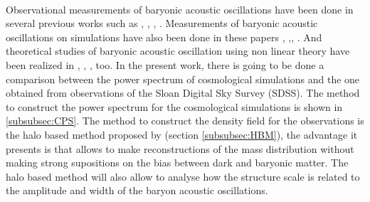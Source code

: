 \

Observational measurements of baryonic acoustic oscillations have been done in several previous works such 
as \cite{Obs01}, \cite{Obs02}, \cite{Obs03}, \cite{Obs04} . Measurements of baryonic acoustic oscillations on simulations 
have also been done in these papers \cite{Sim01}, \cite{Sim02},\cite{Sim03}, \cite{Sim04}.
And theoretical studies of baryonic acoustic oscillation using non linear theory have been realized in \cite{Theo01}, \cite{Theo02},
\cite{Theo03}, \cite{last}  too.  
In the present work, there is going to be done a comparison between the power spectrum of cosmological 
simulations and the one obtained from observations of the Sloan Digital Sky Survey (SDSS). 
The method to construct the power spectrum for the cosmological simulations is shown in \ref{subsubsec:CPS}. 
The method to construct the density field for the observations is the halo based method proposed by \cite{HBM} (section \ref{subsubsec:HBM}), the 
advantage it presents is that allows to make reconstructions of the mass distribution without making strong 
supositions on the bias between dark and baryonic matter. The halo based method will also allow to analyse how 
the structure scale is related to the amplitude and width of the baryon acoustic oscillations. 


